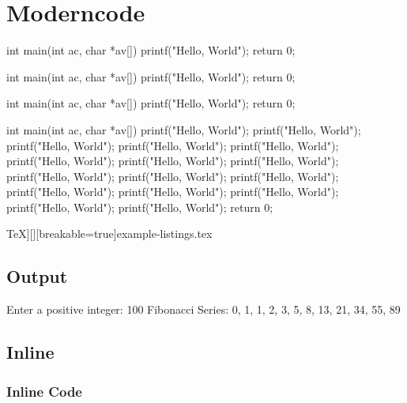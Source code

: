 \documentclass[10pt]{article}
\begin{document}
\section{Moderncode}

\begin{moderncode}[C][][adjusted title={Title}]
int main(int ac, char *av[])
{
	printf("Hello, World");
	return 0;
}
\end{moderncode}

\begin{moderncode}[C][][adjusted title={This title is very very very very very very very very very long}]
int main(int ac, char *av[])
{
	printf("Hello, World");
	return 0;
}
\end{moderncode}

\begin{moderncode}[C]
int main(int ac, char *av[])
{
	printf("Hello, World");
	return 0;
}
\end{moderncode}

\begin{moderncode}[C][][adjusted title={This is a very long code}]
int main(int ac, char *av[])
{
	printf("Hello, World");
	printf("Hello, World");
	printf("Hello, World");
	printf("Hello, World");
	printf("Hello, World");
	printf("Hello, World");
	printf("Hello, World");
	printf("Hello, World");
	printf("Hello, World");
	printf("Hello, World");
	printf("Hello, World");
	printf("Hello, World");
	printf("Hello, World");
	printf("Hello, World");
	printf("Hello, World");
	printf("Hello, World");
	return 0;
}
\end{moderncode}

\moderncodeinput[[LaTeX]TeX][][breakable=true]{example-listings.tex}

\subsection{Output}

\begin{moderncodeout}
Enter a positive integer: 100
Fibonacci Series: 0, 1, 1, 2, 3, 5, 8, 13, 21, 34, 55, 89
\end{moderncodeout}

\subsection{Inline}

\subsubsection{Inline Code}
\end{document}
